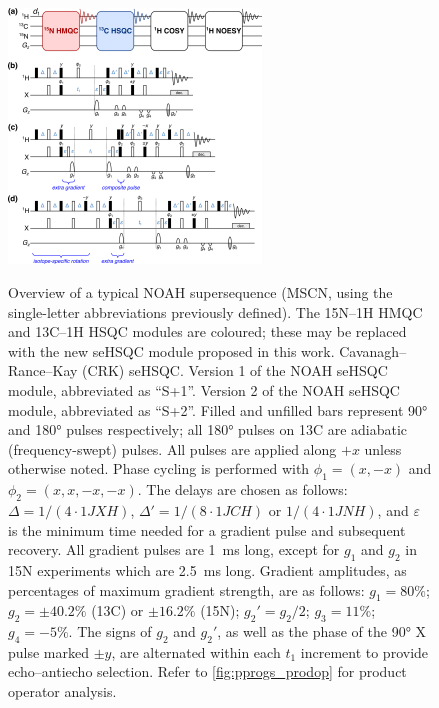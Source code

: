 \documentclass[11pt]{article}
\newcommand*{\noahSpa}{S+1}
\newcommand*{\noahSpb}{S+2}
\newcommand*{\carbon}{13C}
\newcommand*{\proton}{1H}
\newcommand*{\nitrogen}{15N}
\newcommand*{\onejxh}{1JXH}
\newcommand*{\onejch}{1JCH}
\newcommand*{\onejnh}{1JNH}
\begin{document}
\begin{refsection}
\begin{figure}
    \centering
    \includegraphics[width=0.6\textwidth]{pprogs.png}
    {\label{fig:pprogs_overview}}
    {\label{fig:pprogs_crk}}
    {\label{fig:pprogs_spv1}}
    {\label{fig:pprogs_spv2}}
    \caption{
        \textbf{} Overview of a typical NOAH supersequence (MSCN, using the single-letter abbreviations previously defined\autocite{Kupce2017ACIE}).
        The \nitrogen{}--\proton{} HMQC and \carbon{}--\proton{} HSQC modules are coloured; these may be replaced with the new seHSQC module proposed in this work.
        \textbf{} Cavanagh--Rance--Kay (CRK) seHSQC.\autocite{sehsqc}
        \textbf{} Version 1 of the NOAH seHSQC module, abbreviated as ``\noahSpa{}''.
        \textbf{} Version 2 of the NOAH seHSQC module, abbreviated as ``\noahSpb{}''.
        Filled and unfilled bars represent \ang{90} and \ang{180} pulses respectively; all \ang{180} pulses on \carbon{} are adiabatic (frequency-swept) pulses.
        All pulses are applied along $+x$ unless otherwise noted.
        Phase cycling is performed with $\phi_1 = (x, -x)$ and $\phi_2 = (x, x, -x, -x)$.
        The delays are chosen as follows: $\Delta = 1/(4\cdot\onejxh)$, $\Delta' = 1/(8\cdot\onejch)$ or $1/(4\cdot\onejnh)$, and $\varepsilon$ is the minimum time needed for a gradient pulse and subsequent recovery.
        All gradient pulses are \SI{1}{\ms} long, except for $g_1$ and $g_2$ in \nitrogen{} experiments which are \SI{2.5}{\ms} long.
        Gradient amplitudes, as percentages of maximum gradient strength, are as follows: $g_1 = 80\%$; $g_2 = \pm 40.2\%$ (\carbon{}) or $\pm 16.2\%$ (\nitrogen{}); ${g_2}' = g_2/2$; $g_3 = 11\%$; $g_4 = -5\%$.
        The signs of $g_2$ and ${g_2}'$, as well as the phase of the \ang{90} X pulse marked $\pm y$, are alternated within each $t_1$ increment to provide echo--antiecho selection.
        Refer to \cref{fig:pprogs_prodop} for product operator analysis.
    }
    \label{fig:pprogs}
\end{figure}


\end{refsection}
\end{document}
